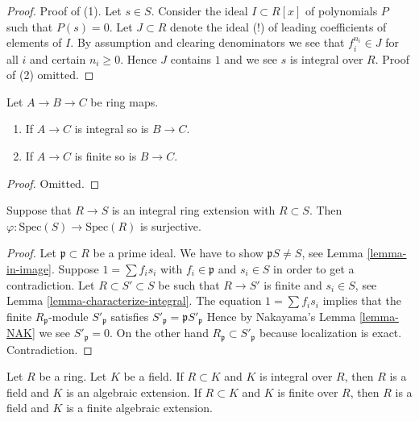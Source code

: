 \begin{proof}
Proof of (1).
Let $s \in S$. Consider the ideal $I \subset R[x]$ of
polynomials $P$ such that $P(s) = 0$. Let $J \subset R$
denote the ideal (!) of leading coefficients of elements of $I$.
By assumption and clearing denominators
we see that $f_i^{n_i} \in J$ for all $i$
and certain $n_i \geq 0$. Hence $J$ contains $1$ and we see
$s$ is integral over $R$. Proof of (2) omitted.
\end{proof}

\begin{lemma}
\label{lemma-integral-permanence}
Let $A \to B \to C$ be ring maps.
\begin{enumerate}
\item If $A \to C$ is integral so is $B \to C$.
\item If $A \to C$ is finite so is $B \to C$.
\end{enumerate}
\end{lemma}

\begin{proof}
Omitted.
\end{proof}

\begin{lemma}
\label{lemma-integral-overring-surjective}
Suppose that $R \to S$ is an integral
ring extension with $R \subset S$.
Then $\varphi : \text{Spec}(S) \to \text{Spec}(R)$
is surjective.
\end{lemma}

\begin{proof}
Let $\mathfrak p \subset R$ be a prime ideal.
We have to show $\mathfrak pS \not = S$, see Lemma \ref{lemma-in-image}.
Suppose $1 = \sum f_i s_i$ with $f_i \in \mathfrak p$
and $s_i \in S$ in order to get a contradiction.
Let $R \subset S' \subset S$
be such that $R\to S'$ is finite and $s_i \in S$,
see Lemma \ref{lemma-characterize-integral}.
The equation $1 = \sum f_i s_i$ implies that
the finite $R_{\mathfrak p}$-module
$S'_{\mathfrak p}$ satisfies
$S'_{\mathfrak p} = \mathfrak pS'_{\mathfrak p}$
Hence by Nakayama's Lemma \ref{lemma-NAK}
we see $S'_{\mathfrak p} = 0$. On the other hand
$R_{\mathfrak p} \subset S'_{\mathfrak p}$ because localization
is exact. Contradiction.
\end{proof}

\begin{lemma}
\label{lemma-integral-under-field}
Let $R$ be a ring. Let $K$ be a field.
If $R \subset K$ and $K$ is integral over $R$,
then $R$ is a field and $K$ is an algebraic extension.
If $R \subset K$ and $K$ is finite over $R$,
then $R$ is a field and $K$ is a finite algebraic extension.
\end{lemma}

